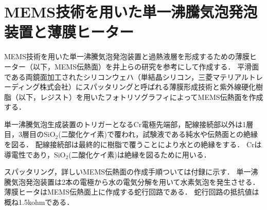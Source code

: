 \section{MEMS技術を用いた単一沸騰気泡発泡装置と薄膜ヒーター}
MEMS技術を用いた単一沸騰気泡発泡装置と過熱液層を形成するための薄膜ヒーター（以下，MEMS伝熱面）を井上ら\cite{Inoue2016}の研究を参考にして作成する．
平滑面である両鏡面加工されたシリコンウェハ（単結晶シリコン，三菱マテリアルトレーディング株式会社）にスパッタリングと呼ばれる薄膜形成技術と紫外線硬化樹脂（以下，レジスト）を用いたフォトリソグラフィによってMEMS伝熱面を作成する．

単一沸騰気泡生成装置のトリガーとなるCr電極先端部，配線接続部以外は1層目，3層目のSiO$_{2}$(二酸化ケイ素)で覆われ，試験液である純水や伝熱面との絶縁を図る．
配線接続部は最終的に樹脂で覆うことにより水との絶縁をする．
Crは導電性であり，SiO$_{2}$(二酸化ケイ素)は絶縁を図るために用いる．

スパッタリング，詳しいMEMS伝熱面の作成手順ついては付録に示す．
単一沸騰気泡発泡装置は2本の電極から水の電気分解を用いて水素気泡を発生させる．
薄膜ヒータはMEMS伝熱面上に作成する蛇行回路である．
蛇行回路の抵抗値は概ね1.5kohmである．

